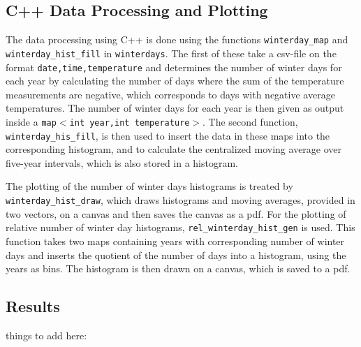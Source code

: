 \documentclass[aps,prl,groupedaddress,twocolumn]{revtex4-1}
\begin{document}
\subsection{C++ Data Processing and Plotting}

The data processing using C++ is done using the functions \texttt{winterday\_map} and \texttt{winterday\_hist\_fill} in \texttt{winterdays}. The first of these take a csv-file on the format \texttt{date,time,temperature} and determines the number of winter days for each year by calculating the number of days where the sum of the temperature measurements are negative, which corresponds to days with negative average temperatures. The number of winter days for each year is then given as output inside a \texttt{map$<$int year,int temperature$>$}. The second function, \texttt{winterday\_his\_fill}, is then used to insert the data in these maps into the corresponding histogram, and to calculate the centralized moving average over five-year intervals, which is also stored in a histogram.

The plotting of the number of winter days histograms is treated by \texttt{winterday\_hist\_draw}, which draws histograms and moving averages, provided in two vectors, on a canvas and then saves the canvas as a pdf. For the plotting of relative number of winter day histograms, \texttt{rel\_winterday\_hist\_gen} is used. This function takes two maps containing years with corresponding number of winter days and inserts the quotient of the number of days into a histogram, using the years as bins. The histogram is then drawn on a canvas, which is saved to a pdf.

\subsection{Results}

things to add here:
\end{document}

